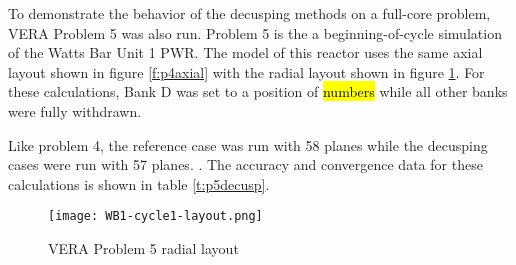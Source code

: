 \begin{table}
\centering
\caption{VERA Problem 4 Decusping Results}\label{t:p4decusp}
\end{table}


To demonstrate the behavior of the decusping methods on a full-core problem, VERA Problem 5 was also run.  Problem 5 is the a beginning-of-cycle simulation of the Watts Bar Unit 1 PWR.  The model of this reactor uses the same axial layout shown in figure \ref{f:p4axial} with the radial layout shown in figure \ref{f:p5radial}.  For these calculations, Bank D was set to a position of \hl{numbers} while all other banks were fully withdrawn.

Like problem 4, the reference case was run with 58 planes while the decusping cases were run with 57 planes.  .  The accuracy and convergence data for these calculations is shown in table \ref{t:p5decusp}.

\begin{figure}
\centering
\texttt{[image: WB1-cycle1-layout.png]}
\caption{VERA Problem 5 radial layout}\label{f:p5radial}
\end{figure}

